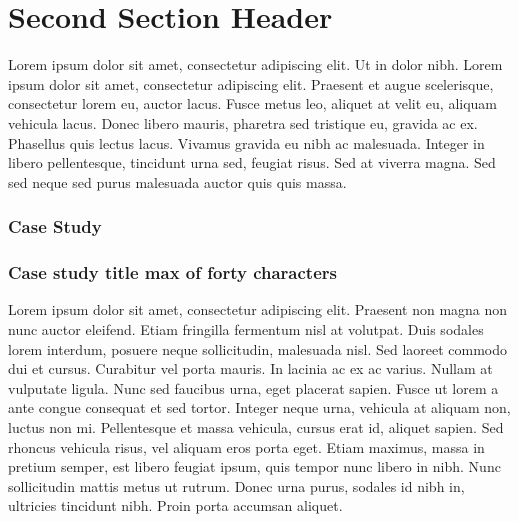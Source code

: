 \documentclass[
]{book}
\begin{document}
\hypertarget{second-section-header-1}{%
\section{Second Section Header}\label{second-section-header-1}}

Lorem ipsum dolor sit amet, consectetur adipiscing elit. Ut in dolor nibh. Lorem ipsum dolor sit amet, consectetur adipiscing elit. Praesent et augue scelerisque, consectetur lorem eu, auctor lacus. Fusce metus leo, aliquet at velit eu, aliquam vehicula lacus. Donec libero mauris, pharetra sed tristique eu, gravida ac ex. Phasellus quis lectus lacus. Vivamus gravida eu nibh ac malesuada. Integer in libero pellentesque, tincidunt urna sed, feugiat risus. Sed at viverra magna. Sed sed neque sed purus malesuada auctor quis quis massa.

\hypertarget{case-study-1}{%
\subsubsection*{Case Study}\label{case-study-1}}

\hypertarget{box-text}{%
\subsubsection*{Case study title max of forty characters}\label{box-text}}

Lorem ipsum dolor sit amet, consectetur adipiscing elit. Praesent non magna non nunc auctor eleifend. Etiam fringilla fermentum nisl at volutpat. Duis sodales lorem interdum, posuere neque sollicitudin, malesuada nisl. Sed laoreet commodo dui et cursus. Curabitur vel porta mauris. In lacinia ac ex ac varius. Nullam at vulputate ligula. Nunc sed faucibus urna, eget placerat sapien. Fusce ut lorem a ante congue consequat et sed tortor. Integer neque urna, vehicula at aliquam non, luctus non mi. Pellentesque et massa vehicula, cursus erat id, aliquet sapien. Sed rhoncus vehicula risus, vel aliquam eros porta eget. Etiam maximus, massa in pretium semper, est libero feugiat ipsum, quis tempor nunc libero in nibh. Nunc sollicitudin mattis metus ut rutrum. Donec urna purus, sodales id nibh in, ultricies tincidunt nibh. Proin porta accumsan aliquet.
\end{document}
